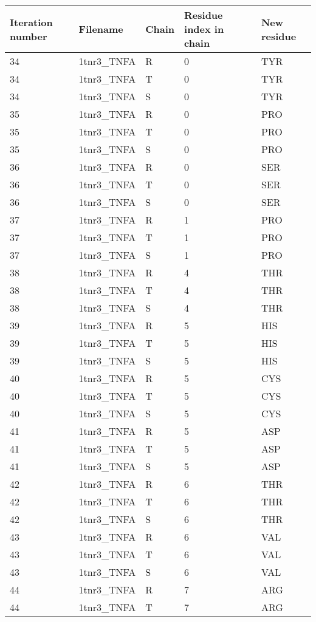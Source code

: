 \begin{tiny}
\begin{longtable}[l]{l|l|l|l|l}
	Iteration number & Filename & Chain & Residue index in chain & New residue\\ \hline
	34 & 1tnr3\_TNFA & R & 0 & TYR \\
	34 & 1tnr3\_TNFA & T & 0 & TYR \\
	34 & 1tnr3\_TNFA & S & 0 & TYR \\
	35 & 1tnr3\_TNFA & R & 0 & PRO \\
	35 & 1tnr3\_TNFA & T & 0 & PRO \\
	35 & 1tnr3\_TNFA & S & 0 & PRO \\
	36 & 1tnr3\_TNFA & R & 0 & SER \\
	36 & 1tnr3\_TNFA & T & 0 & SER \\
	36 & 1tnr3\_TNFA & S & 0 & SER \\
	37 & 1tnr3\_TNFA & R & 1 & PRO \\
	37 & 1tnr3\_TNFA & T & 1 & PRO \\
	37 & 1tnr3\_TNFA & S & 1 & PRO \\
	38 & 1tnr3\_TNFA & R & 4 & THR \\
	38 & 1tnr3\_TNFA & T & 4 & THR \\
	38 & 1tnr3\_TNFA & S & 4 & THR \\
	39 & 1tnr3\_TNFA & R & 5 & HIS \\
	39 & 1tnr3\_TNFA & T & 5 & HIS \\
	39 & 1tnr3\_TNFA & S & 5 & HIS \\
	40 & 1tnr3\_TNFA & R & 5 & CYS \\
	40 & 1tnr3\_TNFA & T & 5 & CYS \\
	40 & 1tnr3\_TNFA & S & 5 & CYS \\
	41 & 1tnr3\_TNFA & R & 5 & ASP \\
	41 & 1tnr3\_TNFA & T & 5 & ASP \\
	41 & 1tnr3\_TNFA & S & 5 & ASP \\
	42 & 1tnr3\_TNFA & R & 6 & THR \\
	42 & 1tnr3\_TNFA & T & 6 & THR \\
	42 & 1tnr3\_TNFA & S & 6 & THR \\
	43 & 1tnr3\_TNFA & R & 6 & VAL \\
	43 & 1tnr3\_TNFA & T & 6 & VAL \\
	43 & 1tnr3\_TNFA & S & 6 & VAL \\
	44 & 1tnr3\_TNFA & R & 7 & ARG \\
	44 & 1tnr3\_TNFA & T & 7 & ARG \\

\end{longtable}
\end{tiny}
